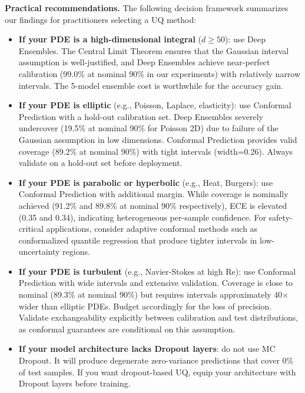 \documentclass[12pt,a4paper]{article}
\theoremstyle{plain}
\begin{document}
\textbf{Practical recommendations.} The following decision framework
summarizes our findings for practitioners selecting a UQ method:

\begin{itemize}
    \item \textbf{If your PDE is a high-dimensional integral} ($d \geq 50$):
        use Deep Ensembles. The Central Limit Theorem ensures that the Gaussian
        interval assumption is well-justified, and Deep Ensembles achieve
        near-perfect calibration (99.0\% at nominal 90\% in our experiments)
        with relatively narrow intervals. The 5-model ensemble cost is
        worthwhile for the accuracy gain.

    \item \textbf{If your PDE is elliptic} (e.g., Poisson, Laplace, elasticity):
        use Conformal Prediction with a hold-out calibration set. Deep Ensembles
        severely undercover (19.5\% at nominal 90\% for Poisson 2D) due to
        failure of the Gaussian assumption in low dimensions. Conformal
        Prediction provides valid coverage (89.2\% at nominal 90\%) with
        tight intervals (width=0.26). Always validate on a hold-out set
        before deployment.

    \item \textbf{If your PDE is parabolic or hyperbolic} (e.g., Heat, Burgers):
        use Conformal Prediction with additional margin. While coverage is
        nominally achieved (91.2\% and 89.8\% at nominal 90\% respectively),
        ECE is elevated (0.35 and 0.34), indicating heterogeneous
        per-sample confidence. For safety-critical applications, consider
        adaptive conformal methods such as conformalized quantile regression
        \citep{romano2020conformalized} that produce tighter intervals in
        low-uncertainty regions.

    \item \textbf{If your PDE is turbulent} (e.g., Navier-Stokes at high Re):
        use Conformal Prediction with wide intervals and extensive validation.
        Coverage is close to nominal (89.3\% at nominal 90\%) but requires
        intervals approximately 40× wider than elliptic PDEs. Budget
        accordingly for the loss of precision. Validate exchangeability
        explicitly between calibration and test distributions, as conformal
        guarantees are conditional on this assumption.

    \item \textbf{If your model architecture lacks Dropout layers}:
        do not use MC Dropout. It will produce degenerate zero-variance
        predictions that cover 0\% of test samples. If you want dropout-based
        UQ, equip your architecture with Dropout layers before training.
\end{itemize}
\end{document}
